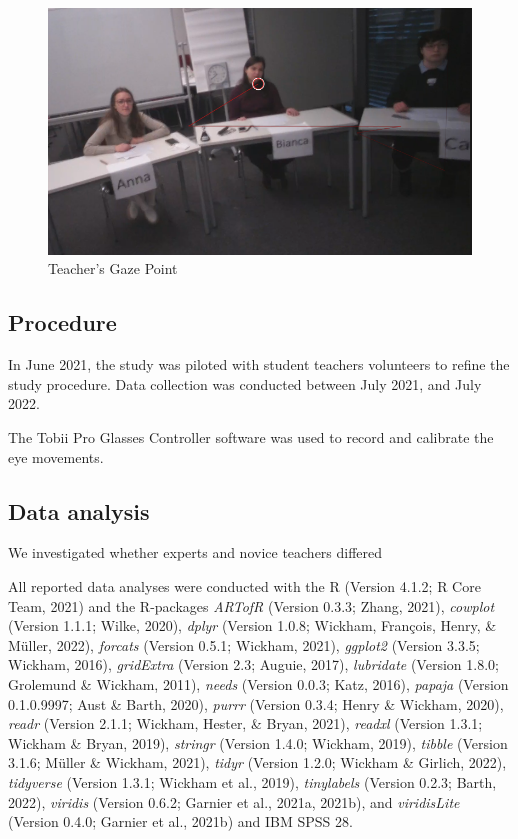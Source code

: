 \documentclass[
  man,floatsintext]{apa6}
\begin{document}
\begin{figure}

{\centering \includegraphics{./pictures/teachergazepoint} 

}

\caption{Teacher's Gaze Point}\label{fig:teachergazepoint}
\end{figure}

\hypertarget{procedure}{%
\subsection{Procedure}\label{procedure}}

In June 2021, the study was piloted with student teachers volunteers to refine the study procedure. Data collection was conducted between July 2021, and July 2022.

The Tobii Pro Glasses Controller software was used to record and calibrate the eye movements.

\hypertarget{data-analysis}{%
\subsection{Data analysis}\label{data-analysis}}

We investigated whether experts and novice teachers differed

All reported data analyses were conducted with the R (Version 4.1.2; R Core Team, 2021) and the R-packages \emph{ARTofR} (Version 0.3.3; Zhang, 2021), \emph{cowplot} (Version 1.1.1; Wilke, 2020), \emph{dplyr} (Version 1.0.8; Wickham, François, Henry, \& Müller, 2022), \emph{forcats} (Version 0.5.1; Wickham, 2021), \emph{ggplot2} (Version 3.3.5; Wickham, 2016), \emph{gridExtra} (Version 2.3; Auguie, 2017), \emph{lubridate} (Version 1.8.0; Grolemund \& Wickham, 2011), \emph{needs} (Version 0.0.3; Katz, 2016), \emph{papaja} (Version 0.1.0.9997; Aust \& Barth, 2020), \emph{purrr} (Version 0.3.4; Henry \& Wickham, 2020), \emph{readr} (Version 2.1.1; Wickham, Hester, \& Bryan, 2021), \emph{readxl} (Version 1.3.1; Wickham \& Bryan, 2019), \emph{stringr} (Version 1.4.0; Wickham, 2019), \emph{tibble} (Version 3.1.6; Müller \& Wickham, 2021), \emph{tidyr} (Version 1.2.0; Wickham \& Girlich, 2022), \emph{tidyverse} (Version 1.3.1; Wickham et al., 2019), \emph{tinylabels} (Version 0.2.3; Barth, 2022), \emph{viridis} (Version 0.6.2; Garnier et al., 2021a, 2021b), and \emph{viridisLite} (Version 0.4.0; Garnier et al., 2021b) and IBM SPSS 28.
\end{document}
